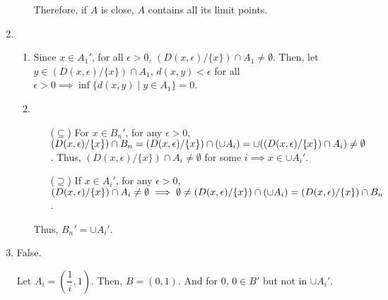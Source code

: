 \documentclass[12pt]{article}
\begin{document}
\begin{enumerate}
\begin{enumerate}
        Therefore, if $A$ is close, $A$ contains all its limit points.
    \end{enumerate}
    \newpage

    \item \begin{enumerate}
        \item Since $x \in A_1'$, for all $\epsilon > 0$, $(D(x, \epsilon)/\lbrace x \rbrace) \cap A_1 \neq \emptyset$.
        Then, let $y \in (D(x, \epsilon)/\lbrace x \rbrace) \cap A_1$, $d(x, y) < \epsilon$ for all $\epsilon > 0\implies \inf\lbrace d(x, y) \mid y \in A_1\rbrace = 0$.

        \item \begin{enumerate}
            \item[($\subseteq$)] For $x \in B_n'$, for any $\epsilon > 0$, $(D(x, \epsilon) / \lbrace x \rbrace) \cap B_n = (D(x, \epsilon) / \lbrace x \rbrace) \cap (\cup A_i) \\
            = \cup((D(x, \epsilon) / \lbrace x \rbrace) \cap A_i) \neq \emptyset$.
            Thus, $(D(x, \epsilon) / \lbrace x \rbrace) \cap A_i\neq \emptyset$ for some $i\implies x \in \cup A_i'$.
            
            \item[($\supseteq$)] If $x \in A_i'$, for any $\epsilon > 0$, $(D(x, \epsilon)/\lbrace x \rbrace) \cap A_i \neq \emptyset\implies \emptyset \neq (D(x, \epsilon) / \lbrace x \rbrace) \cap (\cup A_i) \\
            = (D(x, \epsilon) / \lbrace x \rbrace) \cap B_n$.
        \end{enumerate}

        Thus, $B_n' = \cup A_i'$.
    \end{enumerate}

    \item False.
    
    Let $A_i = (\dfrac{1}{i}, 1)$. Then, $B = (0, 1)$. And for $0$, $0 \in B'$ but not in $\cup A_i'$.
\end{enumerate}
\end{document}

